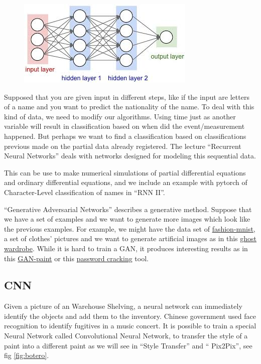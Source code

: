 \documentclass[11pt,letterpaper]{report}
\begin{document}
    	\begin{figure}[h!]
    	\centering
    	\includegraphics[width=0.45\linewidth]{figures/nn.jpg}
    	\caption{}
    	\label{fig:nn}
    \end{figure} 	
    
    Supposed that you are given  input in different steps, like if the input are letters of a name and you want to predict the nationality of the name. To deal with this kind of data, we need to modify our algorithms. Using time just as another variable will result in classification based on when did the event/measurement happened. But perhaps we want to find a classification based on classifications previous made on the partial data already registered. The lecture ``Recurrent Neural Networks'' deals with networks designed for modeling this sequential data.  
    
    This can be use to make numerical simulations of partial differential equations and ordinary differential equations, and we include an example with pytorch of Character-Level classification of names in ``RNN II''.

    ``Generative Adversarial Networks'' describes a generative method. Suppose that we have a set of examples and we want to generate more images which look like the previous examples. For example, we might have the data set of
    \href{https://github.com/zalandoresearch/fashion-mnist}{fashion-mnist}, a set of  clothes' pictures and we want to generate artificial images as in this \href{https://github.com/spaceLenny/FashionDCGANExample}{ghost wardrobe}. While it is hard to train a GAN, it produces interesting results as in this \href{ https://twitter.com/henddkn/status/1067431379804262400?s=19 } {GAN-paint} or this 
    \href{    https://towardsdatascience.com/password-cracker-generating-passwords-with-recurrent-neural-networks-lstms-9583714a3310 
    }{password cracking} tool.

	\subsection{CNN}
	
	Given a picture of an Warehouse Shelving, a  neural network can immediately identify the objects and add them to the inventory. Chinese government used face recognition to identify fugitives in a music concert. It is possible to train a special Neural Network called Convolutional Neural Network, to transfer the style of a paint into a different paint as we will see in ``Style Transfer'' and `` Pix2Pix'', see fig \ref{fig:botero}. 
	
\end{document}
